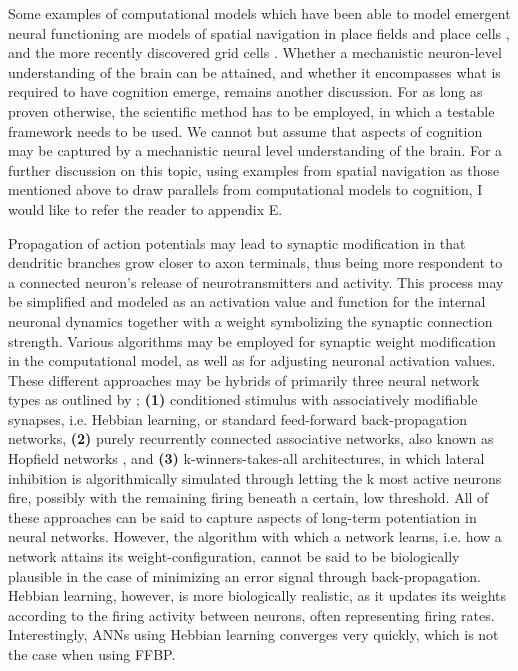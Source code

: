 Some examples of computational models which have been able to model emergent neural functioning are models of spatial navigation in place fields and place cells \citep{OKeefe1976, OKeefe1996}, and the more recently discovered grid cells \citep{Hafting2005}.
Whether a mechanistic neuron-level understanding of the brain can be attained, and whether it encompasses what is required to have cognition emerge, remains another discussion. For as long as proven otherwise, the scientific method has to be employed, in which a testable framework needs to be used. We cannot but assume that aspects of cognition may be captured by a mechanistic neural level understanding of the brain.
For a further discussion on this topic, using examples from spatial navigation as those mentioned above to draw parallels from computational models to cognition, I would like to refer the reader to appendix E.

Propagation of action potentials may lead to synaptic modification in that dendritic branches grow closer to axon terminals, thus being more respondent to a connected neuron's release of neurotransmitters and activity. This process may be simplified and modeled as an activation value and function for the internal neuronal dynamics together with a weight symbolizing the synaptic connection strength. Various algorithms may be employed for synaptic weight modification in the computational model, as well as for adjusting neuronal activation values. These different approaches may be hybrids of primarily three neural network types as outlined by \cite{Rolls1998chpt1};
\textbf{(1)} conditioned stimulus with associatively modifiable synapses, i.e. Hebbian learning, or standard feed-forward back-propagation networks,
\textbf{(2)} purely recurrently connected associative networks, also known as Hopfield networks \citep{Hopfield1982}, and
\textbf{(3)} k-winners-takes-all architectures, in which lateral inhibition is algorithmically simulated through letting the k most active neurons fire, possibly with the remaining firing beneath a certain, low threshold. 
All of these approaches can be said to capture aspects of long-term potentiation in neural networks. However, the algorithm with which a network learns, i.e. how a network attains its weight-configuration, cannot be said to be biologically plausible in the case of minimizing an error signal through back-propagation. Hebbian learning, however, is more biologically realistic, as it updates its weights according to the firing activity between neurons, often representing firing rates. Interestingly, ANNs using Hebbian learning converges very quickly, which is not the case when using FFBP.

